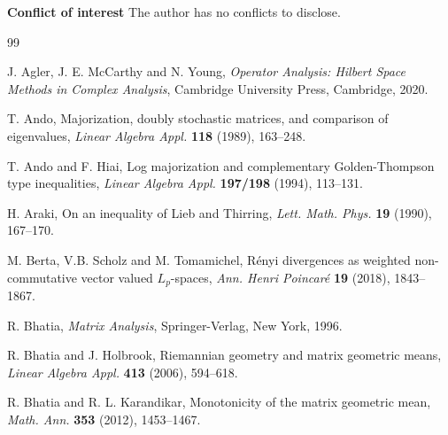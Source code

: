 \documentclass[11pt,reqno]{article}
\numberwithin{equation}{section}
\begin{document}
{\bf Conflict of interest}\enspace
The author has no conflicts to disclose.


\begin{thebibliography}{99}

J. Agler, J. E. McCarthy and N. Young, {\it Operator Analysis: Hilbert Space Methods in Complex Analysis},
Cambridge University Press, Cambridge, 2020.

 T. Ando, Majorization, doubly stochastic matrices, and
comparison of eigenvalues, {\it Linear Algebra Appl.} {\bf 118} (1989), 163--248.

T. Ando and F. Hiai, Log majorization and complementary Golden-Thompson type inequalities,
{\it Linear Algebra Appl.} {\bf 197/198} (1994), 113--131.


H. Araki, On an inequality of Lieb and Thirring, {\it Lett. Math. Phys.} {\bf 19}
(1990), 167--170.

%

M. Berta, V.B. Scholz and M. Tomamichel, R\'enyi divergences as weighted non-commutative
vector valued $L_p$-spaces, {\it Ann. Henri Poincar\'e} {\bf 19} (2018), 1843--1867.

R. Bhatia, {\it Matrix Analysis}, Springer-Verlag, New York, 1996.

R. Bhatia and J. Holbrook, Riemannian geometry and matrix geometric means,
{\it Linear Algebra Appl.} {\bf 413} (2006), 594--618.


R. Bhatia and R. L. Karandikar, Monotonicity of the matrix geometric mean,
{\it Math. Ann.} {\bf 353} (2012), 1453--1467.



\end{thebibliography}
\end{document}

